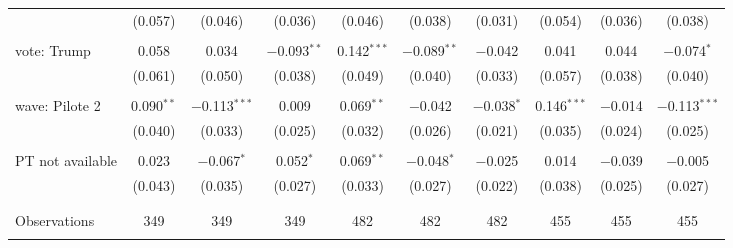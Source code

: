 \begin{tabular}{@{\extracolsep{5pt}}lccccccccc}
  & (0.057) & (0.046) & (0.036) & (0.046) & (0.038) & (0.031) & (0.054) & (0.036) & (0.038) \\ 
  & & & & & & & & & \\ 
 vote: Trump & 0.058 & 0.034 & $-$0.093$^{**}$ & 0.142$^{***}$ & $-$0.089$^{**}$ & $-$0.042 & 0.041 & 0.044 & $-$0.074$^{*}$ \\ 
  & (0.061) & (0.050) & (0.038) & (0.049) & (0.040) & (0.033) & (0.057) & (0.038) & (0.040) \\ 
  & & & & & & & & & \\ 
 wave: Pilote 2 & 0.090$^{**}$ & $-$0.113$^{***}$ & 0.009 & 0.069$^{**}$ & $-$0.042 & $-$0.038$^{*}$ & 0.146$^{***}$ & $-$0.014 & $-$0.113$^{***}$ \\ 
  & (0.040) & (0.033) & (0.025) & (0.032) & (0.026) & (0.021) & (0.035) & (0.024) & (0.025) \\ 
  & & & & & & & & & \\ 
 PT not available & 0.023 & $-$0.067$^{*}$ & 0.052$^{*}$ & 0.069$^{**}$ & $-$0.048$^{*}$ & $-$0.025 & 0.014 & $-$0.039 & $-$0.005 \\ 
  & (0.043) & (0.035) & (0.027) & (0.033) & (0.027) & (0.022) & (0.038) & (0.025) & (0.027) \\ 
  & & & & & & & & & \\ 
\hline \\[-1.8ex] 

Observations & 349 & 349 & 349 & 482 & 482 & 482 & 455 & 455 & 455 \\ 
\hline 
\hline \\[-1.8ex] 
\end{tabular} 